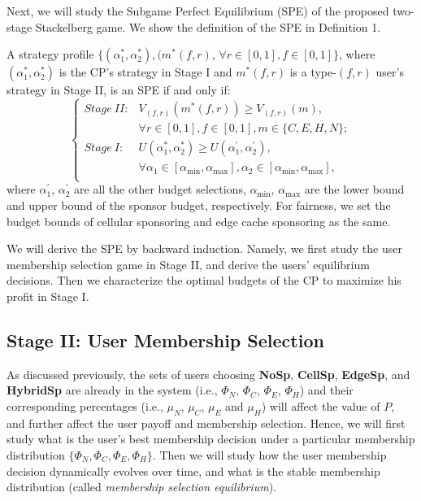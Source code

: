 Next, we will study the Subgame Perfect Equilibrium (SPE) of the proposed two-stage Stackelberg game. We show the definition of the SPE in Definition 1.

\begin{myDef}
	A strategy profile $\{(\alpha_1^*, \alpha_2^*),(m^*(f, r)$, $\forall r\in [0,1], f\in [0,1]\}$, where $(\alpha_1^*, \alpha_2^*)$ is the CP's strategy in Stage I and $m^*(f, r)$ is a type-$(f, r)$ user's strategy in Stage II, is an SPE if and only if:
\begin{equation}
\left\{
\begin{aligned}
Stage~II: & V_{(f, r)}(m^*(f, r)) \ge V_{(f, r)}(m), \\
& \forall r\in [0,1], f\in [0,1], m \in\{ C, E, H, N\};  \\
Stage~I: & U(\alpha_1^*,\alpha_2^*) \ge U(\alpha_1^\prime,\alpha_2^\prime),\\
& \forall \alpha_1 \in [\alpha_{\min},\alpha_{\max}], \alpha_2 \in [\alpha_{\min},\alpha_{\max}], \\
\end{aligned}
\right.
\end{equation}
 where $\alpha_1^\prime$, $\alpha_2^\prime$ are all the other budget selections, $\alpha_{\min}$, $\alpha_{\max}$ are the lower bound and upper bound of the sponsor budget, respectively. For fairness, we set the budget bounds of cellular sponsoring and edge cache sponsoring as the same.
\end{myDef}

We will derive the SPE by backward induction. Namely, we first study the user membership selection game in Stage II, and derive the users' equilibrium decisions. Then we characterize the optimal budgets of the CP to maximize his profit in Stage I.

\subsection{Stage II: User Membership Selection}
As discussed previously, the sets of users choosing \textbf{NoSp}, \textbf{CellSp}, \textbf{EdgeSp}, and \textbf{HybridSp} are already in the system (i.e., $\Phi_N$, $\Phi_C$, $\Phi_E$, $\Phi_H$) and their corresponding percentages (i.e., $\mu_N$, $\mu_C$, $\mu_E$ and $\mu_H$) will affect the value of $P$, and further affect the user payoff and membership selection. Hence, we will first study what is the user's best membership decision under a particular membership distribution $\{\Phi_N, \Phi_C, \Phi_E, \Phi_H\}$. Then we will study how the user membership decision dynamically evolves over time, and what is the stable membership distribution (called \emph{membership selection equilibrium}).

